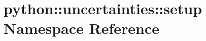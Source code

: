 \hypertarget{namespacepython_1_1uncertainties_1_1setup}{
\section{python::uncertainties::setup Namespace Reference}
\label{namespacepython_1_1uncertainties_1_1setup}
}
